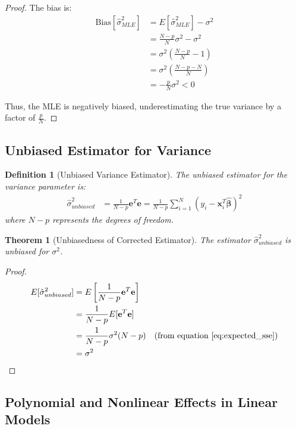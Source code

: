 \documentclass{article}
\newtheorem{definition}{Definition}
\newtheorem{theorem}{Theorem}
\begin{document}
\begin{proof}
The bias is:
\begin{align}
\text{Bias}[\hat{\sigma}^2_{MLE}] &= E[\hat{\sigma}^2_{MLE}] - \sigma^2 \nonumber\\
&= \frac{N-p}{N}\sigma^2 - \sigma^2 \nonumber\\
&= \sigma^2\left(\frac{N-p}{N} - 1\right) \nonumber\\
&= \sigma^2\left(\frac{N-p-N}{N}\right) \nonumber\\
&= -\frac{p}{N}\sigma^2 < 0 \label{eq:bias_formula}
\end{align}

Thus, the MLE is negatively biased, underestimating the true variance by a factor of $\frac{p}{N}$.
\end{proof}

\subsection{Unbiased Estimator for Variance}

\begin{definition}[Unbiased Variance Estimator]
The unbiased estimator for the variance parameter is:
\begin{align}
\hat{\sigma}^2_{unbiased} &= \frac{1}{N-p}\mathbf{e}^T\mathbf{e} = \frac{1}{N-p}\sum_{i=1}^N (y_i - \mathbf{x}_i^T\hat{\boldsymbol{\beta}})^2 \label{eq:unbiased_sigma2}
\end{align}
where $N-p$ represents the degrees of freedom.
\end{definition}

\begin{theorem}[Unbiasedness of Corrected Estimator]
The estimator $\hat{\sigma}^2_{unbiased}$ is unbiased for $\sigma^2$.
\end{theorem}

\begin{proof}
\begin{align}
E[\hat{\sigma}^2_{unbiased}] &= E\left[\frac{1}{N-p}\mathbf{e}^T\mathbf{e}\right] \nonumber\\
&= \frac{1}{N-p}E[\mathbf{e}^T\mathbf{e}] \nonumber\\
&= \frac{1}{N-p}\sigma^2(N-p) \quad \text{(from equation \ref{eq:expected_sse})} \nonumber\\
&= \sigma^2 \label{eq:unbiased_proof}
\end{align}
\end{proof}

\subsection{Polynomial and Nonlinear Effects in Linear Models}
\end{document}
